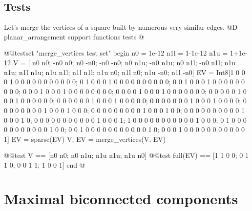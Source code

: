 \subsection{Tests}
Let's merge the vertices of a square built by numerous
very similar edges.
@D planar\_arrangement support functions tests
@{@@testset "merge_vertices test set" begin
    n0 = 1e-12
    n1l = 1-1e-12
    n1u = 1+1e-12
    V = [ n0  n0; -n0  n0;  n0 -n0; -n0 -n0;
          n0 n1u; -n0 n1u;  n0 n1l; -n0 n1l;
         n1u n1u; n1l n1u; n1u n1l; n1l n1l;
         n1u  n0; n1l  n0; n1u -n0; n1l -n0]
    EV = Int8[1 0 0 0 1 0 0 0 0 0 0 0 0 0 0 0;
              0 1 0 0 0 1 0 0 0 0 0 0 0 0 0 0;
              0 0 1 0 0 0 1 0 0 0 0 0 0 0 0 0;
              0 0 0 1 0 0 0 1 0 0 0 0 0 0 0 0;
              0 0 0 0 1 0 0 0 1 0 0 0 0 0 0 0;
              0 0 0 0 0 1 0 0 0 1 0 0 0 0 0 0;
              0 0 0 0 0 0 1 0 0 0 1 0 0 0 0 0;
              0 0 0 0 0 0 0 1 0 0 0 1 0 0 0 0;
              0 0 0 0 0 0 0 0 1 0 0 0 1 0 0 0;
              0 0 0 0 0 0 0 0 0 1 0 0 0 1 0 0;
              0 0 0 0 0 0 0 0 0 0 1 0 0 0 1 0;
              0 0 0 0 0 0 0 0 0 0 0 1 0 0 0 1;
              1 0 0 0 0 0 0 0 0 0 0 0 1 0 0 0;
              0 1 0 0 0 0 0 0 0 0 0 0 0 1 0 0;
              0 0 1 0 0 0 0 0 0 0 0 0 0 0 1 0;
              0 0 0 1 0 0 0 0 0 0 0 0 0 0 0 1]
    EV = sparse(EV)
    V, EV = merge_vertices(V, EV)

    @@test V == [n0 n0; n0 n1u; n1u n1u; n1u n0]
    @@test full(EV) == [1 1 0 0;
                       0 1 1 0;
                       0 0 1 1;
                       1 0 0 1]
end
@}








\section{Maximal biconnected components}
